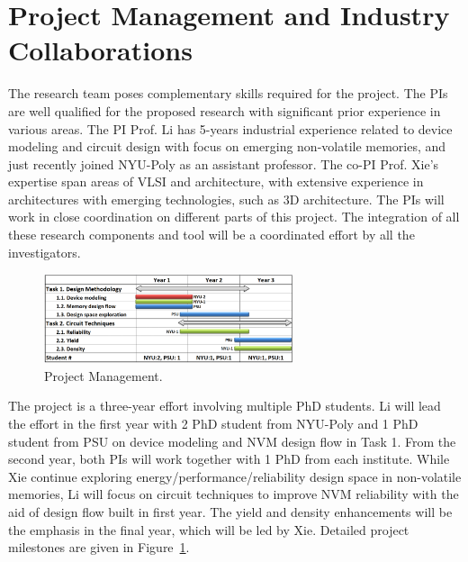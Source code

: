 
\section{Project Management and Industry Collaborations}
%

The research team poses complementary skills required for the project. The PIs are well qualified for the proposed research with significant prior experience in various areas. The PI Prof. Li has 5-years industrial experience related to device modeling and circuit design with focus on emerging non-volatile memories, and just recently joined NYU-Poly as an assistant professor. The co-PI Prof. Xie's expertise span areas of VLSI and architecture, with extensive experience in architectures with emerging technologies, such as 3D architecture. The PIs will work in close coordination on different parts of this project. The integration of all these research components and tool will be a coordinated effort by all the investigators.


\begin{figure}
\includegraphics[width=0.65\textwidth]{./figure/schedule.png}
\vspace{-20pt} \caption{Project Management.}
\label{fig:plan} \vspace{-10pt}
\end{figure}

The project is a three-year effort involving multiple PhD students. Li will lead the effort in the first year with 2 PhD student from NYU-Poly and 1 PhD student from PSU on device modeling and NVM design flow in Task 1. From the second year, both PIs will work together with 1 PhD from each institute. While Xie continue exploring energy/performance/reliability design space in non-volatile memories, Li will focus on circuit techniques to improve NVM reliability with the aid of design flow built in first year. The yield and density enhancements will be the emphasis in the final year, which will be led by Xie. Detailed project milestones are given in Figure~\ref{fig:plan}.

